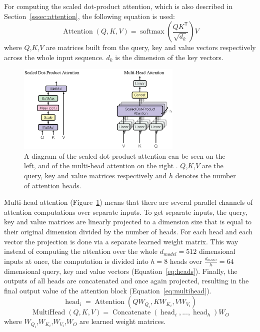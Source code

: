 \documentclass[12pt]{article}
\DeclareMathOperator{\Attention}{Attention}
\DeclareMathOperator{\softmax}{softmax}
\DeclareMathOperator{\MultiHead}{MultiHead}
\DeclareMathOperator{\Concatenate}{Concatenate}
\DeclareMathOperator{\head}{head}
\begin{document}
For computing the scaled dot-product attention, which is also described in Section~\ref{sssec:attention}, the following equation is used:
\begin{equation}
\Attention(Q,K,V)=\softmax\left(\frac{QK^\mathsf{T}}{\sqrt{d_k}}\right)V
\end{equation}
where \(Q\),\(K\),\(V\) are matrices built from the query, key and value vectors respectively across the whole input sequence. \(d_k\) is the dimension of the key vectors.

\begin{figure}[H] 
	\centering
	\includegraphics[width=0.7\textwidth]{pics/trf_attention.png}
	\caption{A diagram of the scaled dot-product attention can be seen on the left, and of the multi-head attention on the right \cite{Vaswani:2017}. \(Q\),\(K\),\(V\) are the query, key and value matrices respectively and \(h\) denotes the number of attention heads.}
	\label{fig:trf_attention}
\end{figure}

Multi-head attention (Figure~\ref{fig:trf_attention}) means that there are several parallel channels of attention computations over separate inputs. To get separate inputs, the query, key and value matrices are linearly projected to a dimension size that is equal to their original dimension divided by the number of heads. For each head and each vector the projection is done via a separate learned weight matrix. This way instead of computing the attention over the whole \(d_{model}=512\) dimensional inputs at once, the computation is divided into \(h=8\) heads over \(\frac{d_{model}}{h}=64\) dimensional query, key and value vectors (Equation~\ref{eq:heads}). Finally, the outputs of all heads are concatenated and once again projected, resulting in the final output value of the attention block (Equation~\ref{eq:multihead}).
\begin{equation}\label{eq:heads}
\head_i=\Attention(QW_{Q_i},KW_{K_i},VW_{V_i})
\end{equation}
\begin{equation} \label{eq:multihead}
\MultiHead(Q,K,V)=\Concatenate(\head_i,...,\head_h)W_O
\end{equation}
where \(W_{Q_i}\),\(W_{K_i}\),\(W_{V_i}\),\(W_{O}\) are learned weight matrices.
\end{document}
